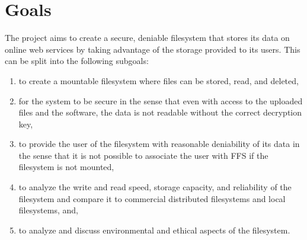 
\section{Goals}


The project aims to create a secure, deniable filesystem that stores its data on online web services by taking advantage of the storage provided to its users. This can be split into the following subgoals:
\begin{enumerate}
\item to create a mountable filesystem where files can be stored, read, and deleted,
\item for the system to be secure in the sense that even with access to the uploaded files and the software, the data is not readable without the correct decryption key, 
\item to provide the user of the filesystem with reasonable deniability of its data in the sense that it is not possible to associate the user with FFS if the filesystem is not mounted,
\item to analyze the write and read speed, storage capacity, and reliability of the filesystem and compare it to commercial distributed filesystems and local filesystems, and,
\item to analyze and discuss environmental and ethical aspects of the filesystem.
\end{enumerate}


